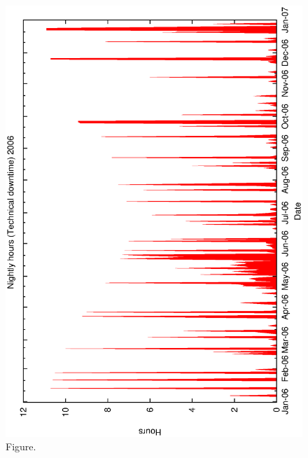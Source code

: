 \documentclass[12pt,a4paper]{article}
\begin{document}
\begin{figure}[htbp]
 \begin{center}
  \includegraphics[scale=1.0, angle=0]{figures/met_nightly_stats_tech2006.eps}
 \end{center}
  \caption[Figure.]
{Figure.}
\end{figure}
\clearpage
\end{document}
